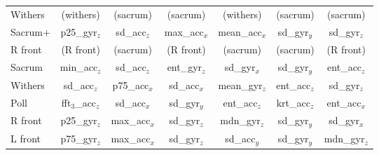 \begin{table}[htb]
{\begin{tabular}[H]{lcccccc}
 \multicolumn{1}{l}{Withers} &     \multicolumn{1}{c}{(withers)} & \multicolumn{1}{c}{(sacrum)} & \multicolumn{1}{c}{(sacrum)} & \multicolumn{1}{c}{(withers)} & \multicolumn{1}{c}{(sacrum)} & \multicolumn{1}{c}{(sacrum)}\\ [0.4 em]
    
    \multicolumn{1}{l}{Sacrum+} &  \multicolumn{1}{c}{p25\_gyr$_z$} & \multicolumn{1}{c}{sd\_acc$_z$} & \multicolumn{1}{c}{max\_acc$_x$} & \multicolumn{1}{c}{mean\_acc$_x$} & \multicolumn{1}{c}{sd\_gyr$_y$} & \multicolumn{1}{c}{sd\_gyr$_z$}\\ [-0.1 em]
    
        \multicolumn{1}{l}{R front}& \multicolumn{1}{c}{(R front)} & \multicolumn{1}{c}{(sacrum)} & \multicolumn{1}{c}{(R front)} & \multicolumn{1}{c}{(sacrum)} & \multicolumn{1}{c}{(sacrum)} & \multicolumn{1}{c}{(R front)}\\ [0.4 em]
    
    \multicolumn{1}{l}{Sacrum} &   \multicolumn{1}{c}{min\_acc$_z$} & \multicolumn{1}{c}{sd\_acc$_z$} & \multicolumn{1}{c}{ent\_gyr$_z$} & \multicolumn{1}{c}{sd\_gyr$_x$} & \multicolumn{1}{c}{sd\_gyr$_y$} & \multicolumn{1}{c}{ent\_acc$_z$} \\ [0.4 em]
    
    \multicolumn{1}{l}{Withers} &  \multicolumn{1}{c}{sd\_acc$_z$} & \multicolumn{1}{c}{p75\_acc$_x$} & \multicolumn{1}{c}{sd\_acc$_x$} & \multicolumn{1}{c}{mean\_gyr$_z$} & \multicolumn{1}{c}{ent\_acc$_z$} & \multicolumn{1}{c}{sd\_gyr$_z$}\\ [0.4 em]
    
    \multicolumn{1}{l}{Poll} &  \multicolumn{1}{c}{{fft$_3$}\_acc$_z$} & \multicolumn{1}{c}{sd\_acc$_x$} & \multicolumn{1}{c}{sd\_gyr$_y$} & \multicolumn{1}{c}{ent\_acc$_z$} & \multicolumn{1}{c}{krt\_acc$_z$} & \multicolumn{1}{c}{ent\_acc$_x$}\\ [0.4 em]
    
     \multicolumn{1}{l}{R front} &  \multicolumn{1}{c}{p25\_gyr$_z$} & \multicolumn{1}{c}{max\_acc$_x$} & \multicolumn{1}{c}{sd\_gyr$_z$} & \multicolumn{1}{c}{mdn\_gyr$_z$} & \multicolumn{1}{c}{sd\_gyr$_y$} & \multicolumn{1}{c}{sd\_gyr$_x$}\\ [0.4 em]
    
     \multicolumn{1}{l}{L front} &  \multicolumn{1}{c}{p75\_gyr$_z$} & \multicolumn{1}{c}{max\_acc$_x$} & \multicolumn{1}{c}{sd\_gyr$_z$} & \multicolumn{1}{c}{sd\_acc$_y$} & \multicolumn{1}{c}{sd\_gyr$_y$} & \multicolumn{1}{c}{mdn\_gyr$_z$}\\ [0.4 em]
    

\end{tabular}}
\end{table}
